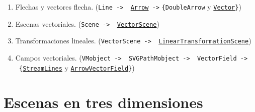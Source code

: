 \documentclass[a4paper]{article}
\begin{document}
\begin{enumerate}

    \item Flechas y vectores flecha. (\texttt{Line -> \ \href{https://docs.manim.community/en/v0.16.0.post0/reference/manim.mobject.geometry.line.Arrow.html?highlight=Arrow}{Arrow} ->} \texttt{\{DoubleArrow} y \href{https://docs.manim.community/en/v0.16.0.post0/reference/manim.mobject.geometry.line.Vector.html?highlight=Vector}{\texttt{Vector}}\texttt{\}})

    \item Escenas vectoriales. (\texttt{Scene -> \ \href{https://docs.manim.community/en/v0.16.0.post0/reference/manim.scene.vector_space_scene.VectorScene.html?highlight=VectorScene}{VectorScene}})

    \item Transformaciones lineales. (\texttt{VectorScene -> \ \href{https://docs.manim.community/en/v0.16.0.post0/reference/manim.scene.vector_space_scene.LinearTransformationScene.html?highlight=LinearTransformationScene}{LinearTransformationScene}})

    \item Campos vectoriales. (\texttt{VMobject -> \ SVGPathMobject -> \ VectorField -> \ \{}\href{https://docs.manim.community/en/v0.16.0.post0/reference/manim.mobject.vector_field.StreamLines.html?highlight=StreamLines}{\texttt{StreamLines}} y \href{https://docs.manim.community/en/v0.16.0.post0/reference/manim.mobject.vector_field.ArrowVectorField.html?highlight=ArrowVectorField}{\texttt{ArrowVectorField}}\texttt{\}})
\end{enumerate}

\section{Escenas en tres dimensiones} \label{Sec: Escenas en tres dimensiones}
\end{document}
